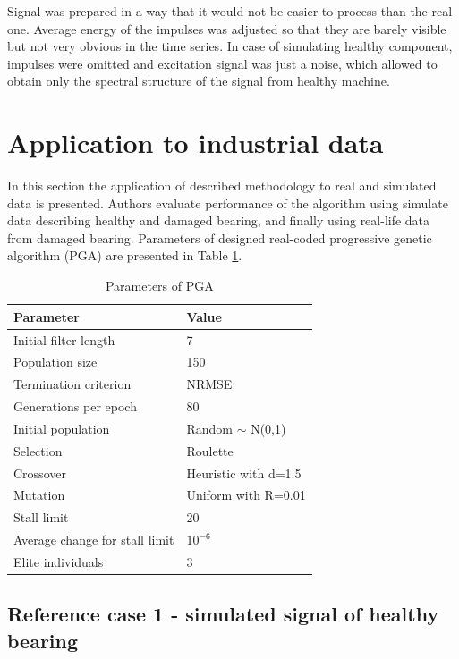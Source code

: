 \documentclass[preprint,12pt]{elsarticle}
\begin{document}
Signal was prepared in a way that it would not be easier to process than the real one. Average energy of the impulses was adjusted so that they are barely visible but not very obvious in the time series. In case of simulating healthy component, impulses were omitted and excitation signal was just a noise, which allowed to obtain only the spectral structure of the signal from healthy machine.

\section{Application to industrial data}

In this section the application of described methodology to real and simulated data is presented. Authors evaluate performance of the algorithm using simulate data describing healthy and damaged bearing, and finally using real-life data from damaged bearing. Parameters of designed real-coded progressive genetic algorithm (PGA) are presented in Table \ref{tab:tab2}.

\begin{table}[ht!]
    \centering
    \caption{Parameters of PGA}
    \begin{tabular}{|l|l|}
    \hline
         \textbf{Parameter} & \textbf{Value} \\ \hline
         Initial filter length & 7 \\ \hline
         Population size & 150 \\ \hline
         Termination criterion & NRMSE \\ \hline
         Generations per epoch & 80 \\ \hline
         Initial population & Random $\sim$ N(0,1) \\ \hline
         Selection & Roulette \\ \hline
         Crossover & Heuristic with d=1.5 \\ \hline
         Mutation & Uniform with R=0.01 \\ \hline
         Stall limit & 20 \\ \hline
         Average change for stall limit & $10^{-6}$ \\ \hline
         Elite individuals & 3 \\
    \hline
    \end{tabular}
    \label{tab:tab2}
\end{table}

\subsection{Reference case 1 - simulated signal of healthy bearing} \label{rc1}
\end{document}
